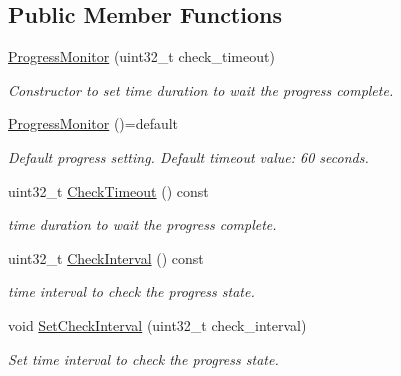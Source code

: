\subsection*{Public Member Functions}
\begin{DoxyCompactItemize}
\item 
\hyperlink{classmilvus_1_1_progress_monitor_aa702e92c695d3824bae1919d636c5fc9}{Progress\+Monitor} (uint32\+\_\+t check\+\_\+timeout)
\begin{DoxyCompactList}\small\item\em Constructor to set time duration to wait the progress complete. \end{DoxyCompactList}\item 
\mbox{\label{classmilvus_1_1_progress_monitor_a52b7ca1617f8084b154a9db5b9adb215}} 
\hyperlink{classmilvus_1_1_progress_monitor_a52b7ca1617f8084b154a9db5b9adb215}{Progress\+Monitor} ()=default
\begin{DoxyCompactList}\small\item\em Default progress setting. Default timeout value\+: 60 seconds. \end{DoxyCompactList}\item 
\mbox{\label{classmilvus_1_1_progress_monitor_a09f423d9f0c9b1707d778d870f434f9e}} 
uint32\+\_\+t \hyperlink{classmilvus_1_1_progress_monitor_a09f423d9f0c9b1707d778d870f434f9e}{Check\+Timeout} () const
\begin{DoxyCompactList}\small\item\em time duration to wait the progress complete. \end{DoxyCompactList}\item 
\mbox{\label{classmilvus_1_1_progress_monitor_a8ed6631cb23206cbe261801ddcd3d7ea}} 
uint32\+\_\+t \hyperlink{classmilvus_1_1_progress_monitor_a8ed6631cb23206cbe261801ddcd3d7ea}{Check\+Interval} () const
\begin{DoxyCompactList}\small\item\em time interval to check the progress state. \end{DoxyCompactList}\item 
void \hyperlink{classmilvus_1_1_progress_monitor_adee24b68d0ced028bb961043e69faed9}{Set\+Check\+Interval} (uint32\+\_\+t check\+\_\+interval)
\begin{DoxyCompactList}\small\item\em Set time interval to check the progress state. \end{DoxyCompactList}\item 

\end{DoxyCompactItemize}
